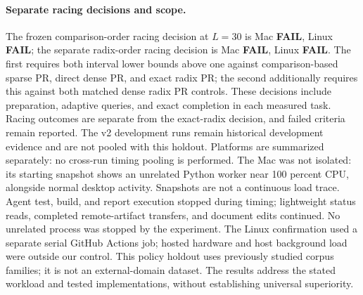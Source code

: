 \paragraph{Separate racing decisions and scope.}
The frozen comparison-order racing decision at $L=30$ is Mac \textbf{FAIL}, Linux \textbf{FAIL}; the separate radix-order racing decision is Mac \textbf{FAIL}, Linux \textbf{FAIL}.
The first requires both interval lower bounds above one against comparison-based sparse PR, direct dense PR, and exact radix PR;
the second additionally requires this against both matched dense radix PR controls.
These decisions include preparation, adaptive queries, and exact completion in each measured task.
Racing outcomes are separate from the exact-radix decision, and failed criteria remain reported.
The v2 development runs remain historical development evidence and are not pooled with this holdout.
Platforms are summarized separately: no cross-run timing pooling is performed.
The Mac was not isolated: its starting snapshot shows an unrelated Python worker near 100 percent CPU, alongside normal desktop activity. Snapshots are not a continuous load trace. Agent test, build, and report execution stopped during timing; lightweight status reads, completed remote-artifact transfers, and document edits continued. No unrelated process was stopped by the experiment.
The Linux confirmation used a separate serial GitHub Actions job; hosted hardware and host background load were outside our control.
This policy holdout uses previously studied corpus families; it is not an external-domain dataset.
The results address the stated workload and tested implementations, without establishing universal superiority.

\par{}
